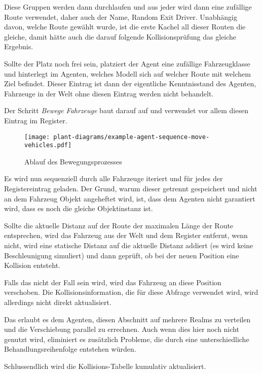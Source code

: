 Diese Gruppen werden dann durchlaufen und aus jeder wird dann eine zufällige Route verwendet, daher auch der Name, Random Exit Driver.
Unabhängig davon, welche Route gewählt wurde, ist die erste Kachel all dieser Routen die gleiche, damit hätte auch die darauf folgende Kollisionsprüfung das gleiche Ergebnis.

Sollte der Platz noch frei sein, platziert der Agent eine zufällige Fahrzeugklasse und hinterlegt im Agenten, welches Modell sich auf welcher Route mit welchem Ziel befindet.
Dieser Eintrag ist dann der eigentliche Kenntnisstand des Agenten, Fahrzeuge in der Welt ohne diesen Eintrag werden nicht behandelt.

Der Schritt \textit{Bewege Fahrzeuge} baut darauf auf und verwendet vor allem diesen Eintrag im Register.

\begin{figure}[htb]
    \centering
    \texttt{[image: plant-diagrams/example-agent-sequence-move-vehicles.pdf]}
    \caption{Ablauf des Bewegungsprozesses}
    \ownsource
    \label{fig:example-agent-sequence-move-vehicle}
\end{figure}

\FloatBarrier

Es wird nun sequenziell durch alle Fahrzeuge iteriert und für jedes der Registereintrag geladen.
Der Grund, warum dieser getrennt gespeichert und nicht an dem Fahrzeug Objekt angeheftet wird, ist, dass dem Agenten nicht garantiert wird, dass es noch die gleiche Objektinstanz ist.

Sollte die aktuelle Distanz auf der Route der maximalen Länge der Route entsprechen, wird das Fahrzeug aus der Welt und dem Register entfernt, wenn nicht, wird eine statische Distanz auf die aktuelle Distanz addiert (es wird keine Beschleunigung simuliert) und dann geprüft, ob bei der neuen Position eine Kollision entsteht.

Falls das nicht der Fall sein wird, wird das Fahrzeug an diese Position verschoben.
Die Kollisionsinformation, die für diese Abfrage verwendet wird, wird allerdings nicht direkt aktualisiert.

Das erlaubt es dem Agenten, diesen Abschnitt auf mehrere Realms zu verteilen und die Verschiebung parallel zu errechnen.
Auch wenn dies hier noch nicht genutzt wird, eliminiert es zusätzlich Probleme, die durch eine unterschiedliche Behandlungsreihenfolge entstehen würden.

Schlussendlich wird die Kollisions-Tabelle kumulativ aktualisiert.


